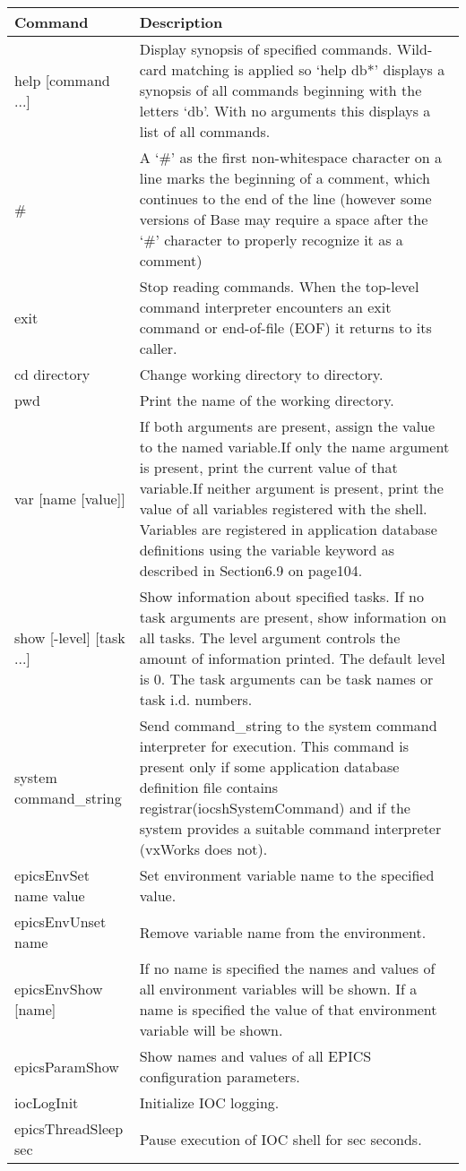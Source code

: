 \begin{center}
\begin{longtable}{p{1.5in}p{4.5in}}
Command & Description\\
\hline
help [command ...] & Display synopsis of specified commands.  Wild-card matching is applied so `help db*' displays a synopsis of all commands beginning with the letters `db'. With no arguments this displays a list of all commands.\\
\# & A `\#' as the first non-whitespace character on a line marks the beginning of a comment, which continues to the end of the line (however some versions of Base may require a space after the `\#' character to properly recognize it as a comment)\\
exit & Stop reading commands. When the top-level command interpreter encounters an exit command or end-of-file (EOF) it returns to its caller.\\
cd directory & Change working directory to directory.\\
pwd & Print the name of the working directory.\\
var [name [value]] & If both arguments are present, assign the value to the named variable.If only the name argument is present, print the current value of that variable.If neither argument is present, print the value of all variables registered with the shell.  Variables are registered in application database definitions using the variable keyword as described in Section6.9 on page104.\\
show [-level] [task ...] & Show information about specified tasks.  If no task arguments are present, show information on all tasks.  The level argument controls the amount of information printed.  The default level is 0.  The task arguments can be task names or task i.d. numbers.\\
system command\_string & Send command\_string to the system command interpreter for execution.  This command is present only if some application database definition file contains registrar(iocshSystemCommand) and if the system provides a suitable command interpreter (vxWorks does not).\\
epicsEnvSet name value & Set environment variable name to the specified value.\\
epicsEnvUnset name & Remove variable name from the environment.\\
epicsEnvShow  [name] & If no name is specified the names and values of all environment variables will be shown. If a name is specified the value of that environment variable will be shown.\\
epicsParamShow & Show names and values of all EPICS configuration parameters.\\
iocLogInit & Initialize IOC logging.\\
epicsThreadSleep sec & Pause execution of IOC shell for sec seconds.
\end{longtable}

\end{center}

